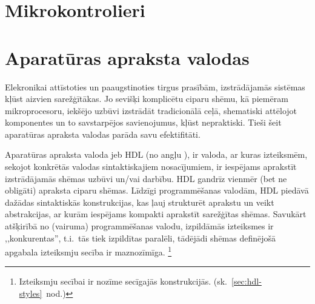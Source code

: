 \section{Mikrokontrolieri} %
\todo




\section{Aparatūras apraksta valodas}
Elekronikai attīstoties un paaugstinoties tirgus prasībām, izstrādājamās
sistēmas kļūst aizvien sarežģītākas. Jo sevišķi komplicētu ciparu shēmu, 
kā piemēram mikroprocesoru, iekšējo uzbūvi izstrādāt tradicionālā ceļā,
shematiski attēlojot komponentes un to savstarpējos savienojumus, kļūst
nepraktiski. Tieši šeit aparatūras apraksta valodas parāda savu efektifitāti.

Aparatūras apraksta valoda jeb HDL
(no angļu ),
ir valoda, ar kuras izteiksmēm, sekojot konkrētās 
valodas sintaktiskajiem nosa\-cī\-jumiem, ir iespējams aprakstīt
izstrādājamās shēmas uzbūvi un/vai darbību.\cite{HDL} %
HDL gandrīz vienmēr (bet ne obligāti) apraksta ciparu shēmas.
Līdzīgi program\-mē\-šanas valodām, HDL piedāvā dažādas sintaktiskās 
konstrukcijas, kas ļauj strukturēt aprakstu un veikt abstrakcijas,
ar kurām iespējams kompakti aprakstīt sarežģītas shēmas.%
\cite[1.~lpp.]{Perry-VHDL}
Savukārt atšķirībā no (vairuma) programmēšanas valodu,
izpildāmās izteiksmes ir ,,konkurentas'', t.i.~tās tiek izpildītas paralēli, 
tādējādi shēmas definējošā apgabala izteiksmju secība ir maznozīmīga.%
\footnote{Izteiksmju secībai ir nozīme secīgajās konstrukcijās.
	(sk.~\ref{sec:hdl-styles}~nod.)}

